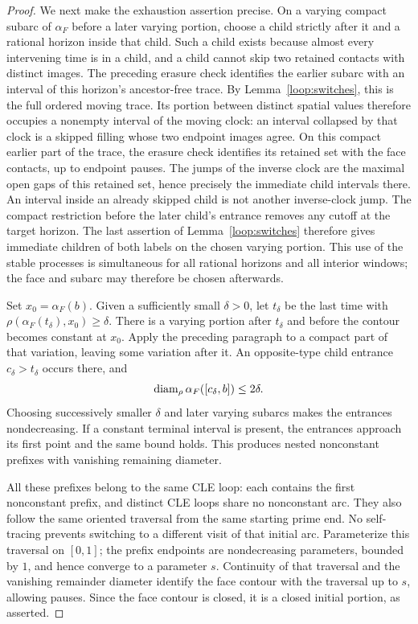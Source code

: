\begin{proof}
We next make the exhaustion assertion precise.  On a varying compact
subarc of $\alpha_F$ before a later varying portion, choose a child
strictly after it and a rational horizon inside that child.  Such a
child exists because almost every intervening time is in a child,
and a child cannot skip two retained contacts with distinct images.
The preceding erasure check identifies the earlier subarc with an
interval of this horizon's ancestor-free trace.  By
Lemma~\ref{loop:switches}, this is the full ordered moving trace.
Its portion between distinct spatial values therefore occupies a
nonempty interval of the moving clock: an interval collapsed by that
clock is a skipped filling whose two endpoint images agree.
On this compact earlier part of the trace, the erasure check identifies
its retained set with the face contacts, up to endpoint pauses.  The
jumps of the inverse clock are the maximal open gaps of this retained
set, hence precisely the immediate child intervals there.  An interval
inside an already skipped child is not another inverse-clock jump.
The compact restriction before the later child's entrance removes any
cutoff at the target horizon.  The last assertion of
Lemma~\ref{loop:switches} therefore gives immediate children of both
labels on the chosen varying portion.  This use of the stable processes is simultaneous
for all rational horizons and all interior windows; the face and
subarc may therefore be chosen afterwards.

Set $x_0=\alpha_F(b)$.  Given a sufficiently small $\delta>0$, let
$t_\delta$ be the last time with
$\rho(\alpha_F(t_\delta),x_0)\ge\delta$.  There is a varying portion
after $t_\delta$ and before the contour becomes constant at $x_0$.
Apply the preceding paragraph to a compact part of that variation,
leaving some variation after it.  An opposite-type child entrance
$c_\delta>t_\delta$ occurs there, and
\[
 \operatorname{diam}_\rho\alpha_F([c_\delta,b])\le2\delta.
\]
Choosing successively smaller $\delta$ and later varying subarcs
makes the entrances nondecreasing.  If a constant terminal interval
is present, the entrances approach its first point and the same bound
holds.  This produces nested nonconstant prefixes with vanishing
remaining diameter.

All these prefixes belong to the same CLE loop: each contains the
first nonconstant prefix, and distinct CLE loops share no nonconstant
arc.  They also follow the same oriented traversal from the same
starting prime end.  No self-tracing prevents switching to a different
visit of that initial arc.  Parameterize this traversal on $[0,1]$;
the prefix endpoints are nondecreasing parameters, bounded by $1$,
and hence converge to a parameter $s$.  Continuity of that traversal
and the vanishing remainder diameter identify the face contour with
the traversal up to $s$, allowing pauses.  Since the face contour is
closed, it is a closed initial portion, as asserted.
\end{proof}

